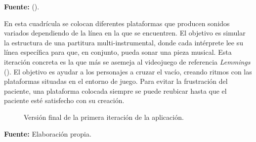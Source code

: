 \begin{center}
	\textbf{Fuente:} \citeauthor{AUTODIDACTA:2020} (\citeyear{AUTODIDACTA:2020}).
\end{center}

En esta cuadrícula se colocan diferentes plataformas que producen sonidos variados dependiendo de la línea en la que se encuentren. El objetivo es simular la estructura de una partitura multi-instrumental, donde cada intérprete lee su línea específica para que, en conjunto, pueda sonar una pieza musical. Esta iteración concreta es la que más se asemeja al videojuego de referencia \textit{Lemmings} (\cite{LEMMINGS:1991}). El objetivo es ayudar a los personajes a cruzar el vacío, creando ritmos con las plataformas situadas en el entorno de juego. Para evitar la frustración del paciente, una plataforma colocada siempre se puede reubicar hasta que el paciente esté satisfecho con su creación.

\begin{figure}[h!]
	\centering
	\hfil
	\caption{Versión final de la primera iteración de la aplicación.}
	\label{fig:Grid}
	\vspace{-18pt}
\end{figure}

\begin{center}
	\textbf{Fuente:} Elaboración propia.
\end{center}

